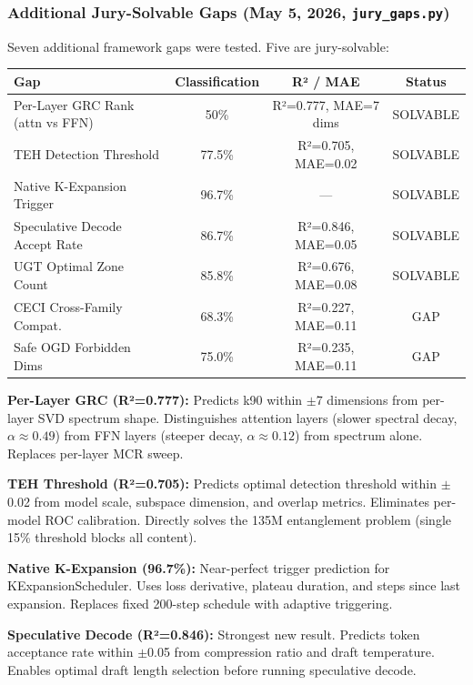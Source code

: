 \documentclass[11pt]{article}
\begin{document}
\subsubsection*{Additional Jury-Solvable Gaps (May 5, 2026, \texttt{jury\_gaps.py})}

Seven additional framework gaps were tested. Five are jury-solvable:

\begin{center}
\begin{tabular}{lccc}
\toprule
\textbf{Gap} & \textbf{Classification} & \textbf{R² / MAE} & \textbf{Status} \\
\midrule
Per-Layer GRC Rank (attn vs FFN) & 50\% & R²=0.777, MAE=7 dims & SOLVABLE \\
TEH Detection Threshold & 77.5\% & R²=0.705, MAE=0.02 & SOLVABLE \\
Native K-Expansion Trigger & 96.7\% & --- & SOLVABLE \\
Speculative Decode Accept Rate & 86.7\% & R²=0.846, MAE=0.05 & SOLVABLE \\
UGT Optimal Zone Count & 85.8\% & R²=0.676, MAE=0.08 & SOLVABLE \\
CECI Cross-Family Compat. & 68.3\% & R²=0.227, MAE=0.11 & GAP \\
Safe OGD Forbidden Dims & 75.0\% & R²=0.235, MAE=0.11 & GAP \\
\bottomrule
\end{tabular}
\end{center}

\textbf{Per-Layer GRC (R²=0.777):} Predicts k90 within $\pm$7 dimensions from per-layer SVD spectrum shape. Distinguishes attention layers (slower spectral decay, $\alpha \approx 0.49$) from FFN layers (steeper decay, $\alpha \approx 0.12$) from spectrum alone. Replaces per-layer MCR sweep.

\textbf{TEH Threshold (R²=0.705):} Predicts optimal detection threshold within $\pm$0.02 from model scale, subspace dimension, and overlap metrics. Eliminates per-model ROC calibration. Directly solves the 135M entanglement problem (single 15\% threshold blocks all content).

\textbf{Native K-Expansion (96.7\%):} Near-perfect trigger prediction for KExpansionScheduler. Uses loss derivative, plateau duration, and steps since last expansion. Replaces fixed 200-step schedule with adaptive triggering.

\textbf{Speculative Decode (R²=0.846):} Strongest new result. Predicts token acceptance rate within $\pm$0.05 from compression ratio and draft temperature. Enables optimal draft length selection before running speculative decode.
\end{document}
